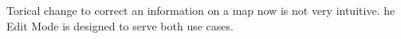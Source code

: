 Torical change to correct an information on a map now is not very intuitive. he Edit Mode is designed to serve both use cases.
